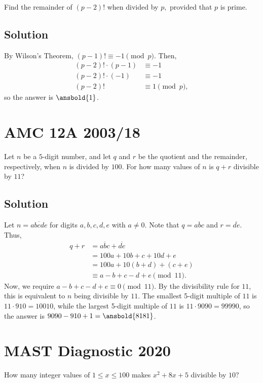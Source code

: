 \documentclass[mast]{lucky}
\begin{document}
Find the remainder of $(p-2)!$ when divided by $p,$ provided that $p$ is prime.

\subsection{Solution}

By Wilson's Theorem, $(p - 1)! \equiv -1 \pmod p$. Then,
\begin{align*}
(p - 2)! \cdot (p - 1) &\equiv -1 \\
(p - 2)! \cdot (-1) &\equiv -1 \\
(p - 2)! &\equiv 1 \pmod p,
\end{align*}
so the answer is $\ansbold{1}$.

\pagebreak\section{AMC 12A 2003/18}

Let $n$ be a $5$-digit number, and let $q$ and $r$ be the quotient and the remainder, respectively, when $n$ is divided by $100$. For how many values of $n$ is $q+r$ divisible by $11$?

\subsection{Solution}

Let $n = \overline{abcde}$ for digits $a, b, c, d, e$ with $a \neq 0$. Note that $q = \overline{abc}$ and $r = \overline{de}$. Thus,
\begin{align*}
q + r &= \overline{abc} + \overline{de} \\
&= 100a + 10b + c + 10d + e \\
&= 100a + 10(b + d) + (c + e) \\
&\equiv a - b + c - d + e \pmod{11}.
\end{align*}
Now, we require $a - b + c - d + e \equiv 0 \pmod{11}$. By the divisibility rule for $11$, this is equivalent to $n$ being divisible by $11$. The smallest 5-digit multiple of $11$ is $11 \cdot 910 = 10010$, while the largest 5-digit multiple of $11$ is $11 \cdot 9090 = 99990$, so the answer is $9090 - 910 + 1 = \ansbold{8181}$.

\pagebreak\section{MAST Diagnostic 2020}

How many integer values of $1\leq x\leq 100$ makes $x^2+8x+5$ divisible by $10?$
\end{document}
